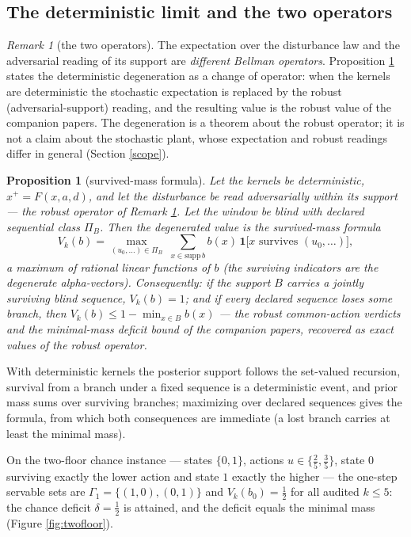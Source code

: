 \documentclass[10pt,twocolumn]{article}
\theoremstyle{plain}
\newtheorem{proposition}[theorem]{Proposition}
\theoremstyle{definition}
\theoremstyle{remark}
\newtheorem{remark}[theorem]{Remark}
\begin{document}
\subsection{The deterministic limit and the two operators}\label{deterministic}

\begin{remark}[the two operators]\label{rem:operators}
The expectation over the disturbance law and the adversarial reading of
its support are \emph{different Bellman operators}. Proposition
\ref{prop:degen} states the deterministic degeneration as a change of
operator: when the kernels are deterministic the stochastic expectation
is replaced by the robust (adversarial-support) reading, and the
resulting value is the robust value of the companion papers. The
degeneration is a theorem about the robust operator; it is not a claim
about the stochastic plant, whose expectation and robust readings differ
in general (Section \ref{scope}).
\end{remark}

\begin{proposition}[survived-mass formula]\label{prop:degen}
Let the kernels be deterministic, \(x^{+} = F(x, a, d)\), and let the
disturbance be read adversarially within its support --- the robust
operator of Remark \ref{rem:operators}. Let the window be blind with
declared sequential class \(\Pi_{B}\). Then the degenerated value is the
\emph{survived-mass formula}
\[
V_{k}(b) = \max_{(u_{0},\dots) \in \Pi_{B}}\;
\sum_{x \in \mathrm{supp}\, b} b(x)\,
\mathbf{1}\bigl[ x \text{ survives } (u_{0}, \dots) \bigr],
\]
a maximum of rational linear functions of \(b\) (the surviving indicators
are the degenerate alpha-vectors). Consequently: if the support \(B\)
carries a jointly surviving blind sequence, \(V_{k}(b) = 1\); and if every
declared sequence loses some branch, then
\(V_{k}(b) \le 1 - \min_{x \in B} b(x)\) --- the robust common-action
verdicts and the minimal-mass deficit bound of the companion papers,
recovered as exact values of the robust operator.
\end{proposition}

With deterministic kernels the posterior support follows the set-valued
recursion, survival from a branch under a fixed sequence is a
deterministic event, and prior mass sums over surviving branches;
maximizing over declared sequences gives the formula, from which both
consequences are immediate (a lost branch carries at least the minimal
mass).

On the two-floor chance instance --- states \(\{0, 1\}\), actions
\(u \in \{\tfrac{2}{5}, \tfrac{3}{5}\}\), state \(0\) surviving exactly
the lower action and state \(1\) exactly the higher --- the one-step
servable sets are \(\Gamma_{1} = \{(1,0), (0,1)\}\) and
\(V_{k}(b_{0}) = \tfrac{1}{2}\) for all audited \(k \le 5\): the chance
deficit \(\delta = \tfrac{1}{2}\) is attained, and the deficit equals the
minimal mass (Figure \ref{fig:twofloor}).
\end{document}
